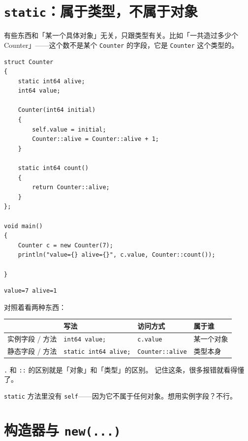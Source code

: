 \section{\texttt{static}：属于类型，不属于对象}

有些东西和「某一个具体对象」无关，只跟类型有关。比如「一共造过多少个 Counter」——这个数不是某个 \texttt{Counter} 的字段，它是 \texttt{Counter} 这个类型的。

\par
\medskip
\begin{lstlisting}[style=chali]
struct Counter
{
    static int64 alive;
    int64 value;

    Counter(int64 initial)
    {
        self.value = initial;
        Counter::alive = Counter::alive + 1;
    }

    static int64 count()
    {
        return Counter::alive;
    }
};

void main()
{
    Counter c = new Counter(7);
    println("value={} alive={}", c.value, Counter::count());

}
\end{lstlisting}
\par
\medskip

\par
\medskip
\begin{lstlisting}[style=out]
value=7 alive=1
\end{lstlisting}
\par
\medskip

对照着看两种东西：

\begin{center}
\begin{tabular}{llll}
\toprule
 & 写法 & 访问方式 & 属于谁 \\
\midrule
实例字段 / 方法 & \texttt{int64 value;} & \texttt{c.\allowbreak{}value} & 某一个对象 \\
静态字段 / 方法 & \texttt{static int64 alive;} & \texttt{Counter:\allowbreak{}:\allowbreak{}alive} & 类型本身 \\
\bottomrule
\end{tabular}
\end{center}

\texttt{.\allowbreak{}} 和 \texttt{:\allowbreak{}:\allowbreak{}} 的区别就是「对象」和「类型」的区别。 记住这条，很多报错就看得懂了。

\texttt{static} 方法里没有 \texttt{self}——因为它不属于任何对象。想用实例字段？不行。

\section{构造器与 \texttt{new(\allowbreak{}.\allowbreak{}.\allowbreak{}.\allowbreak{})\allowbreak{}}}


